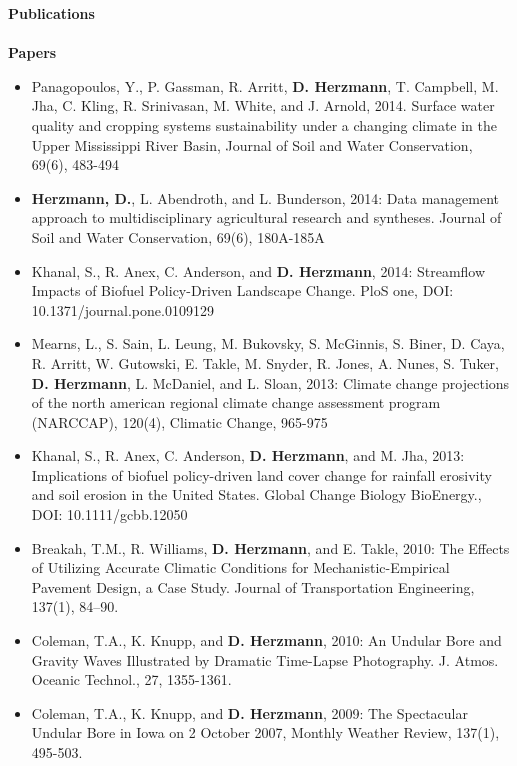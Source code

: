 \Large \bf Publications\\ \\
\normalsize \bf Papers
\normalsize \sf
\begin{itemize}
\item Panagopoulos, Y., P. Gassman, R. Arritt, \textbf{D. Herzmann}, T. Campbell, M. Jha, C. Kling, R. Srinivasan, M. White, and J. Arnold, 2014. Surface water quality and cropping systems sustainability under a changing climate in the Upper Mississippi River Basin, Journal of Soil and Water Conservation, 69(6), 483-494
\item \textbf{Herzmann, D.}, L. Abendroth, and L. Bunderson, 2014: Data management approach to multidisciplinary agricultural research and syntheses. Journal of Soil and Water Conservation, 69(6), 180A-185A
\item Khanal, S., R. Anex, C. Anderson, and \textbf{D. Herzmann}, 2014: Streamflow Impacts of Biofuel Policy-Driven Landscape Change. PloS one, DOI: 10.1371/journal.pone.0109129
\item Mearns, L., S. Sain, L. Leung, M. Bukovsky, S. McGinnis, S. Biner, D. Caya, R. Arritt, W. Gutowski, E. Takle, M. Snyder, R. Jones, A. Nunes, S. Tuker, \textbf{D. Herzmann}, L. McDaniel, and L. Sloan, 2013: Climate change projections of the north american regional climate change assessment program (NARCCAP), 120(4), Climatic Change, 965-975
\item Khanal, S., R. Anex, C. Anderson, \textbf{D. Herzmann}, and M. Jha, 2013: Implications of biofuel policy-driven land cover change for rainfall erosivity and soil erosion in the United States. Global Change Biology BioEnergy., DOI: 10.1111/gcbb.12050
\item Breakah, T.M., R. Williams, \textbf{D. Herzmann}, and E. Takle, 2010: The Effects of Utilizing Accurate Climatic Conditions for Mechanistic-Empirical Pavement Design, a Case Study. Journal of Transportation Engineering, 137(1), 84–90.
\item Coleman, T.A., K. Knupp, and \textbf{D. Herzmann}, 2010: An Undular Bore and Gravity Waves Illustrated by Dramatic Time-Lapse Photography. J. Atmos. Oceanic Technol., 27, 1355-1361.
\item Coleman, T.A., K. Knupp, and \textbf{D. Herzmann}, 2009: The Spectacular Undular Bore in Iowa on 2 October 2007, Monthly Weather Review, 137(1), 495-503.

\end{itemize}

